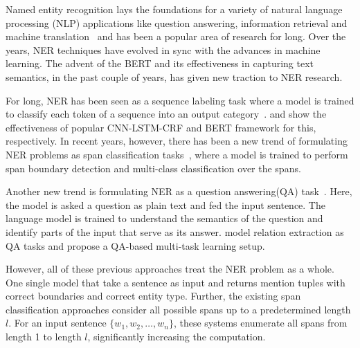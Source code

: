 
Named entity recognition lays the foundations for a variety of natural language processing (NLP) applications like question answering, information retrieval and machine translation~\cite{li2020survey} and has been a popular area of research for long. Over the years, NER techniques have evolved in sync with the advances in machine learning. The advent of the BERT \cite{devlin2019bert} and its effectiveness in capturing text semantics, in the past couple of years, has given new traction to NER research. 

For long, NER has been seen as a sequence labeling task where a model is trained to classify each token of a sequence into an output category~\cite{Chiu16,Lample16,ma2016end,devlin2019bert}.
\cite{ma2016end} and \cite{devlin2018bert} show the effectiveness of popular CNN-LSTM-CRF and BERT framework for this, respectively. 
In recent years, however, there has been a new trend of formulating NER problems 
as span classification tasks~\cite{li2020MRC,Jiang20,Ouchi20}, 
where a model is trained to perform span boundary detection and multi-class classification over the spans.

Another new trend is formulating NER as a question answering(QA) task~\cite{li2020MRC}. Here, the model is asked a question as plain text and fed the input sentence. The language model is trained to understand the semantics of the question and identify parts of the input that serve as its answer. \cite{li2020MRC,levy2017zero} model relation extraction as QA tasks and \cite{mccann2018natural} propose a QA-based multi-task learning setup.

However, all of these previous approaches treat the NER problem as a whole. One single model that take a sentence as input and returns mention tuples with correct boundaries and correct entity type. 
Further, the existing span classification approaches consider all possible spans up to a predetermined length $l$.
For an input sentence $\{w_1, w_2, \ldots, w_n\}$, these systems enumerate all spans from length 1 to length $l$,
significantly increasing the computation.

